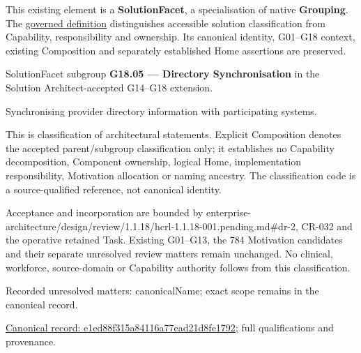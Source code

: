 This existing element is a \textbf{SolutionFacet}, a specialisation of native
\textbf{Grouping}. The \href{\detokenize{../../../../../../../governance/continuum-representation.md#solutionfacet-classification--1119-candidate}}{governed definition}
distinguishes accessible solution classification from Capability, responsibility
and ownership. Its canonical identity, G01–G18 context, existing Composition
and separately established Home assertions are preserved.



SolutionFacet subgroup \textbf{G18.05 — Directory Synchronisation} in the Solution Architect-accepted G14–G18 extension.



Synchronising provider directory information with participating systems.



This is classification of architectural statements. Explicit Composition denotes the accepted parent/subgroup classification only; it establishes no Capability decomposition, Component ownership, logical Home, implementation responsibility, Motivation allocation or naming ancestry. The classification code is a source-qualified reference, not canonical identity.



Acceptance and incorporation are bounded by enterprise-architecture/design/review/1.1.18/hcrl-1.1.18-001.pending.md\#dr-2, CR-032 and the operative retained Task. Existing G01–G13, the 784 Motivation candidates and their separate unresolved review matters remain unchanged. No clinical, workforce, source-domain or Capability authority follows from this classification.


{\small Recorded unresolved matters: canonicalName; exact scope remains in the canonical record.}\par
{\footnotesize \href{../../../../../../../continuum/grouping/e1ed88f315a84116a77ead21d8fe1792.md}{Canonical record: e1ed88f315a84116a77ead21d8fe1792}; full qualifications and provenance.}\par
